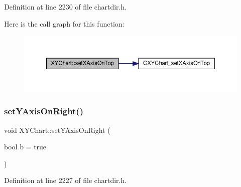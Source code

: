 Definition at line 2230 of file chartdir.\+h.

Here is the call graph for this function\+:
\nopagebreak
\begin{figure}[H]
\begin{center}
\leavevmode
\includegraphics[width=350pt]{class_x_y_chart_a7cca8475736683fec321ed407b93771b_cgraph}
\end{center}
\end{figure}
\mbox{\label{class_x_y_chart_ad21b25e04ddc8979e85967c5f6659610}} 
\subsubsection{\texorpdfstring{set\+Y\+Axis\+On\+Right()}{setYAxisOnRight()}}
{\footnotesize\ttfamily void X\+Y\+Chart\+::set\+Y\+Axis\+On\+Right (\begin{DoxyParamCaption}\item[{bool}]{b = {\ttfamily true} }\end{DoxyParamCaption})\hspace{0.3cm}{\ttfamily [inline]}}



Definition at line 2227 of file chartdir.\+h.

